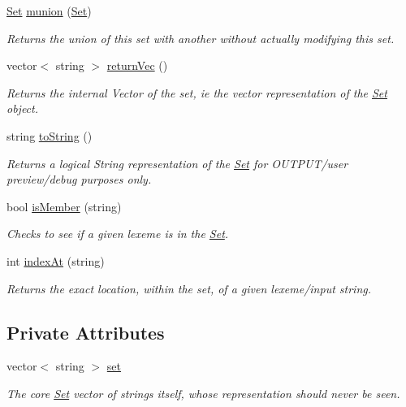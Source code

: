 \begin{DoxyCompactItemize}
\hyperlink{classSet}{Set} \hyperlink{classSet_ad28bf0706c650cbb019ed16b258d1441}{munion} (\hyperlink{classSet}{Set})
\begin{DoxyCompactList}\small\item\em Returns the union of this set with another without actually modifying this set. \item\end{DoxyCompactList}\item 
vector$<$ string $>$ \hyperlink{classSet_a380e493b3c87097ef6096be6330139b7}{returnVec} ()
\begin{DoxyCompactList}\small\item\em Returns the internal Vector of the set, ie the vector representation of the \hyperlink{classSet}{Set} object. \item\end{DoxyCompactList}\item 
string \hyperlink{classSet_aa321f0090bb4f590363556e03375e9ae}{toString} ()
\begin{DoxyCompactList}\small\item\em Returns a logical String representation of the \hyperlink{classSet}{Set} for OUTPUT/user preview/debug purposes only. \item\end{DoxyCompactList}\item 
bool \hyperlink{classSet_a4f539b8baf5e31d8c79cae9381a9e8be}{isMember} (string)
\begin{DoxyCompactList}\small\item\em Checks to see if a given lexeme is in the \hyperlink{classSet}{Set}. \item\end{DoxyCompactList}\item 
int \hyperlink{classSet_a8e7922429ab244828e26e98ffc10d11f}{indexAt} (string)
\begin{DoxyCompactList}\small\item\em Returns the exact location, within the set, of a given lexeme/input string. \item\end{DoxyCompactList}\end{DoxyCompactItemize}
\subsection*{Private Attributes}
\begin{DoxyCompactItemize}
\item 
vector$<$ string $>$ \hyperlink{classSet_a074020de568f1ff5a2f4a2033ada72ff}{set}
\begin{DoxyCompactList}\small\item\em The core \hyperlink{classSet}{Set} vector of strings itself, whose representation should never be seen. \item\end{DoxyCompactList}\end{DoxyCompactItemize}


